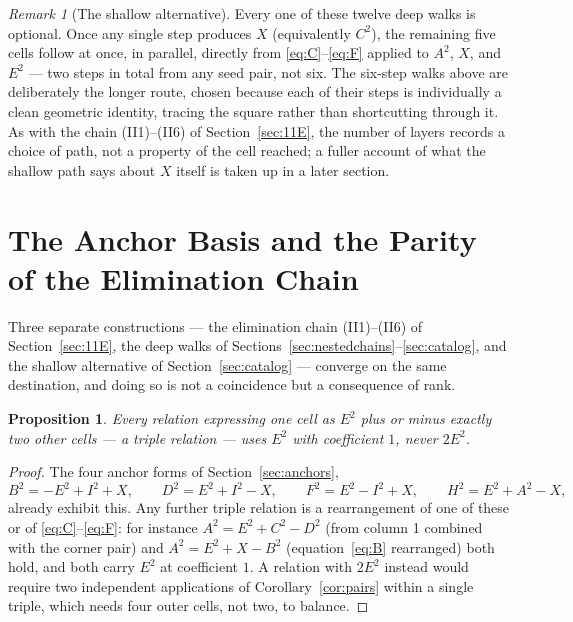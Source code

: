 \documentclass[12pt]{article}
\newtheorem{proposition}[theorem]{Proposition}
\theoremstyle{remark}
\newtheorem{remark}[theorem]{Remark}
\begin{document}
\begin{remark}[The shallow alternative]
Every one of these twelve deep walks is optional. Once any single step
produces $X$ (equivalently $C^2$), the remaining five cells follow at
once, in parallel, directly from \eqref{eq:C}--\eqref{eq:F} applied to
$A^2$, $X$, and $E^2$ --- two steps in total from any seed pair, not
six. The six-step walks above are deliberately the longer route,
chosen because each of their steps is individually a clean geometric
identity, tracing the square rather than shortcutting through it. As
with the chain (II1)--(II6) of Section~\ref{sec:11E}, the number of
layers records a choice of path, not a property of the cell reached; a
fuller account of what the shallow path says about $X$ itself is taken
up in a later section.
\end{remark}

\section{The Anchor Basis and the Parity of the Elimination Chain}\label{sec:anchorparity}

Three separate constructions --- the elimination chain
(II1)--(II6) of Section~\ref{sec:11E}, the deep walks of
Sections~\ref{sec:nestedchains}--\ref{sec:catalog}, and the shallow
alternative of Section~\ref{sec:catalog} --- converge on the same
destination, and doing so is not a coincidence but a consequence of
rank.

\begin{proposition}\label{prop:tripleE}
Every relation expressing one cell as $E^2$ plus or minus exactly two
other cells --- a \emph{triple} relation --- uses $E^2$ with
coefficient $1$, never $2E^2$.
\end{proposition}

\begin{proof}
The four anchor forms of Section~\ref{sec:anchors},
\[
B^2=-E^2+I^2+X, \qquad D^2=E^2+I^2-X, \qquad F^2=E^2-I^2+X, \qquad
H^2=E^2+A^2-X ,
\]
already exhibit this. Any further triple relation is a rearrangement
of one of these or of \eqref{eq:C}--\eqref{eq:F}: for instance
$A^2=E^2+C^2-D^2$ (from column 1 combined with the corner pair) and
$A^2=E^2+X-B^2$ (equation~\eqref{eq:B} rearranged) both hold, and both
carry $E^2$ at coefficient $1$. A relation with $2E^2$ instead would
require two independent applications of Corollary~\ref{cor:pairs}
within a single triple, which needs four outer cells, not two, to
balance.
\end{proof}
\end{document}
